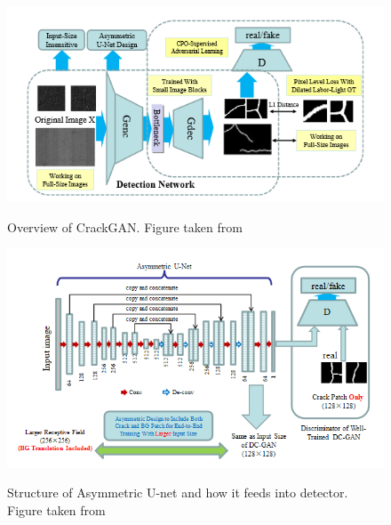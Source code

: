 \documentclass[11pt]{article}		%
\newlength{\imageheight}	 %
\begin{document}
	        
	        \begin{figure}[h]
				\centering
				\begin{multicols}{2}
					\includegraphics[height=\imageheight]{CrackGan_Overview}
					\caption{Overview of CrackGAN. Figure taken from \cite{CrackGAN1}}
					\label{crackGAN_Overview}
					\columnbreak
					\includegraphics[height=\imageheight]{assymmetric_unet}
					\caption{Structure of Asymmetric U-net and how it feeds into detector. Figure taken from \cite{CrackGAN1}}
					\label{assymmetric-unet}
			 \end{multicols}
			\end{figure}	
    		
\end{document}
